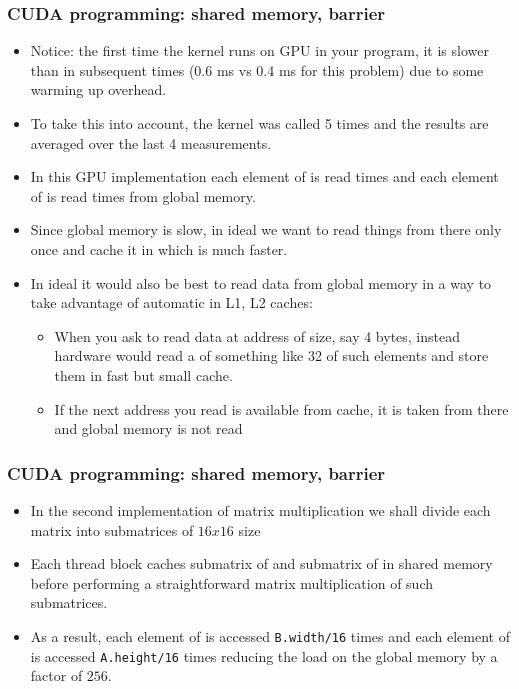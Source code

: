 \begin{frame}[fragile]
  \frametitle{CUDA programming: shared memory, barrier}
\begin{itemize}
\item Notice: the first time the kernel runs on GPU in your program, it is slower than in subsequent times (0.6 ms vs 0.4 ms for this problem) due to some warming up overhead.
\item To take this into account, the kernel was called 5 times and the results are averaged over the last 4 measurements.
\item In this GPU implementation each element of  is read  times and each element of 
   is read  times from global memory. 
\item Since global memory is slow, in ideal we want to read things from there only
  once and cache it in  which is much faster. 
\item In ideal it would also be best to read data from global memory in a  way to take advantage of automatic  in L1, L2 caches:
  \begin{itemize}
    \item When you ask to read data at address  of size, say 4 bytes, instead hardware would read a  of something like 32 of such elements and store them in fast but small cache.
    \item If the next address you read is available from cache, it is taken from there and global memory is not read
  \end{itemize}
\end{itemize}
\end{frame}


\begin{frame}[fragile]
  \frametitle{CUDA programming: shared memory, barrier}
\begin{itemize}
\item In the second implementation of matrix multiplication we shall divide each matrix into submatrices of $16x16$ size
\item Each thread block caches submatrix of  
  and submatrix of  in shared memory before performing 
  a straightforward matrix multiplication of such submatrices.
\item As a result, each element of  is accessed {\color{mycolorcode}\verb|B.width/16|} 
  times and each element of  is accessed {\color{mycolorcode}\verb|A.height/16|} 
  times reducing the load on the global memory by a factor of $256$.
\end{itemize}
\end{frame}

